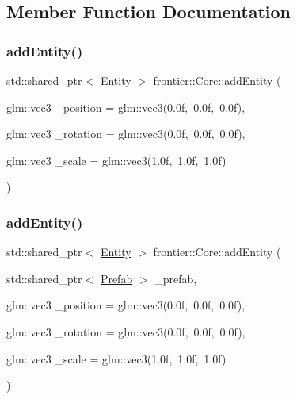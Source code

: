 \subsection{Member Function Documentation}
\mbox{\label{classfrontier_1_1_core_a7224247d328741220fae73fc4893bdc3}} 
\subsubsection{\texorpdfstring{add\+Entity()}{addEntity()}\hspace{0.1cm}{\footnotesize\ttfamily [1/2]}}
{\footnotesize\ttfamily std\+::shared\+\_\+ptr$<$ \hyperlink{classfrontier_1_1_entity}{Entity} $>$ frontier\+::\+Core\+::add\+Entity (\begin{DoxyParamCaption}\item[{glm\+::vec3}]{\+\_\+position = {\ttfamily glm\+:\+:vec3(0.0f,~0.0f,~0.0f)},  }\item[{glm\+::vec3}]{\+\_\+rotation = {\ttfamily glm\+:\+:vec3(0.0f,~0.0f,~0.0f)},  }\item[{glm\+::vec3}]{\+\_\+scale = {\ttfamily glm\+:\+:vec3(1.0f,~1.0f,~1.0f)} }\end{DoxyParamCaption})}

\mbox{\label{classfrontier_1_1_core_a1e419fcdea7e95bc334238d425bd8377}} 
\subsubsection{\texorpdfstring{add\+Entity()}{addEntity()}\hspace{0.1cm}{\footnotesize\ttfamily [2/2]}}
{\footnotesize\ttfamily std\+::shared\+\_\+ptr$<$ \hyperlink{classfrontier_1_1_entity}{Entity} $>$ frontier\+::\+Core\+::add\+Entity (\begin{DoxyParamCaption}\item[{std\+::shared\+\_\+ptr$<$ \hyperlink{classfrontier_1_1_prefab}{Prefab} $>$}]{\+\_\+prefab,  }\item[{glm\+::vec3}]{\+\_\+position = {\ttfamily glm\+:\+:vec3(0.0f,~0.0f,~0.0f)},  }\item[{glm\+::vec3}]{\+\_\+rotation = {\ttfamily glm\+:\+:vec3(0.0f,~0.0f,~0.0f)},  }\item[{glm\+::vec3}]{\+\_\+scale = {\ttfamily glm\+:\+:vec3(1.0f,~1.0f,~1.0f)} }\end{DoxyParamCaption})}

